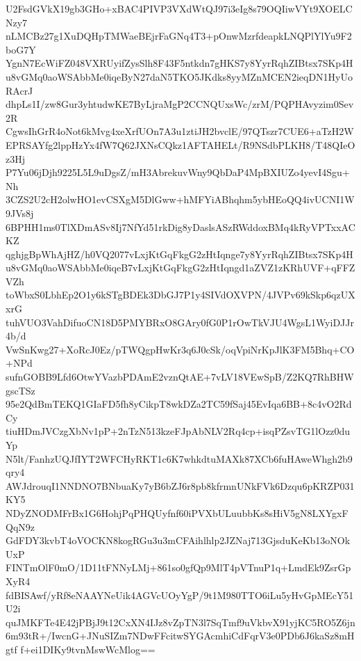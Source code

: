 U2FsdGVkX19gb3GHo+xBAC4PIVP3VXdWtQJ97i3eIg8s79OQIiwVYt9XOELCNzy7
nLMCBz27g1XuDQHpTMWaeBEjrFaGNq4T3+pOnwMzrfdeapkLNQPlYlYu9F2boG7Y
YgnN7EcWiFZ048VXRUyifZysSlh8F43F5ntkdn7gHKS7y8YyrRqhZIBtsx7SKp4H
u8vGMq0aoWSAbbMe0iqeByN27daN5TKO5JKdks8yyMZnMCEN2ieqDN1HyUoRAcrJ
dhpLs1I/zw8Gur3yhtudwKE7ByLjraMgP2CCNQUxsWc/zrM/PQPHAvyzim0Sev2R
CgwsIhGrR4oNot6kMvg4xeXrfUOn7A3u1ztiJH2bvclE/97QTszr7CUE6+aTzH2W
EPRSAYfg2lppHzYx4fW7Q62JXNsCQkz1AFTAHELt/R9NSdbPLKH8/T48QIeOz3Hj
P7Yu06jDjh9225L5L9uDgsZ/mH3AbrekuvWny9QbDaP4MpBXIUZo4yevI4Sgu+Nh
3CZS2U2cH2olwHO1evCSXgM5DlGww+hMFYiABhqhm5ybHEoQQ4ivUCNI1W9JVs8j
6BPHH1ms0TlXDmASv8Ij7NfYd51rkDig8yDaslsASzRWddoxBMq4kRyVPTxxACKZ
qghjgBpWhAjHZ/h0VQ2077vLxjKtGqFkgG2zHtIqnge7y8YyrRqhZIBtsx7SKp4H
u8vGMq0aoWSAbbMe0iqeB7vLxjKtGqFkgG2zHtIqngd1aZVZ1zKRhUVF+qFFZVZh
toWbxS0LbhEp2O1y6kSTgBDEk3DbGJ7P1y4SIVdOXVPN/4JVPv69kSkp6qzUXxrG
tuhVUO3VahDifuoCN18D5PMYBRxO8GAry0fG0P1rOwTkVJU4WgsL1WyiDJJr4b/d
VwSnKwg27+XoRcJ0Ez/pTWQgpHwKr3q6J0cSk/oqVpiNrKpJlK3FM5Bhq+CO+NPd
sufnGOBB9Lfd6OtwYVazbPDAmE2vznQtAE+7vLV18VEwSpB/Z2KQ7RhBHWgscTSz
95e2QdBmTEKQ1GIaFD5fh8yCikpT8wkDZa2TC59fSaj45EvIqa6BB+8c4vO2RdCy
tiuHDmJVCzgXbNv1pP+2nTzN513kzeFJpAbNLV2Rq4cp+isqPZsvTG1lOzz0duYp
N5lt/FanhzUQJfIYT2WFCHyRKT1c6K7whkdtuMAXk87XCb6fuHAweWhgh2b9qry4
AWJdrouqI1NNDNO7BNbuaKy7yB6bZJ6r8pb8kfrmnUNkFVk6Dzqu6pKRZP031KY5
NDyZNODMFrBx1G6HohjPqPHQUyfnf60iPVXbULuubbKs8sHiV5gN8LXYgxFQqN9z
GdFDY3kvbT4oVOCKN8kogRGu3u3mCFAihlhlp2JZNaj713GjsduKeKb13oNOkUxP
FINTmOlF0mO/1D11tFNNyLMj+861so0gfQp9MlT4pVTnuP1q+LmdEk9ZsrGpXyR4
fdBISAwf/yRf8eNAAYNeUik4AGVcUOyYgP/9t1M980TTO6iLu5yHvGpMEcY51U2i
quJMKFTe4E42jPBjJ9t12CxXN4IJz8vZpTN3l7SqTmf9uVkbvX91yjKC5RO5Z6jn
6m93tR+/IwcnG+JNuSIZm7NDwFFcitwSYGAcmhiCdFqrV3e0PDb6J6kaSz8mHgtf
f+ei1DIKy9tvnMswWcMlog==
